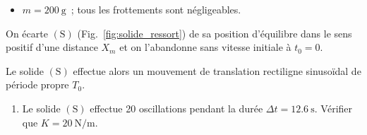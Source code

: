 \begin{donnees}
    \begin{itemize}
        \item $m=\qty{200}{\gram}$~;
              tous les frottements sont négligeables.
    \end{itemize}
\end{donnees}
    
On écarte $\mathrm{(S)}$ (Fig.~\ref{fig:solide_ressort}) de sa position
d'équilibre dans le sens positif d'une distance $X_{m}$ et on l'abandonne sans
vitesse initiale à $t_{0}=0$.

Le solide $\mathrm{(S)}$ effectue alors un mouvement de translation rectiligne
sinusoïdal de période propre $T_{0}$.
\begin{enumerate}
    \item Le solide $\mathrm{(S)}$ effectue 20 oscillations pendant la durée
          $\Delta t=\qty{12,6}{\second}$.
          Vérifier que $K=\qty{20}{\newton\per\meter}$.
\end{enumerate}
